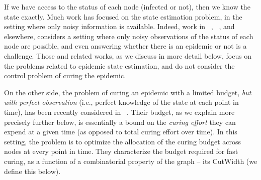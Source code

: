 If we have access to the status of each node (infected or not), then we know the state exactly. Much work has focused on the state estimation problem, in the setting where only noisy information is available. Indeed, work in ~\cite{Milling2015,Milling2015a,meirom2015}, ~\cite{Arias-castro2011,Arias-Castro2008,Arias-castro}, and elsewhere, considers a setting where only noisy observations of the status of each node are possible, and even answering whether there is an epidemic or not is a challenge. Those and related works, as we discuss in more detail below, focus on the problems related to epidemic state estimation, and do not consider the control problem of curing the epidemic.

%

On the other side, the problem of curing an epidemic with a limited budget, {\em but with perfect observation} (i.e., perfect knowledge of the state at each point in time), has been recently considered in ~\cite{Drakopoulos2015a,Drakopoulos2014}. Their budget, as we explain more precisely further below, is essentially a bound on the {\em curing effort} they can expend at a given time (as opposed to total curing effort over time). In this setting, the problem is to optimize the allocation of the curing budget across nodes at every point in time. They characterize the budget required for fast curing, as a function of a combinatorial property of the graph -- its {\sc CutWidth} (we define this below).

